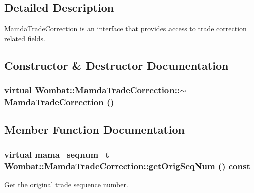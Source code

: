 \subsection{Detailed Description}
\hyperlink{classWombat_1_1MamdaTradeCorrection}{Mamda\-Trade\-Correction} is an interface that provides access to trade correction related fields. 



\subsection{Constructor \& Destructor Documentation}
\hypertarget{classWombat_1_1MamdaTradeCorrection_b4d18a65d80de13f1a889dce7055a47a}{
\subsubsection[$\sim$MamdaTradeCorrection]{\setlength{\rightskip}{0pt plus 5cm}virtual Wombat::Mamda\-Trade\-Correction::$\sim$Mamda\-Trade\-Correction ()}}
\label{classWombat_1_1MamdaTradeCorrection_b4d18a65d80de13f1a889dce7055a47a}




\subsection{Member Function Documentation}
\hypertarget{classWombat_1_1MamdaTradeCorrection_fcec3aec725d1d8fdcb304769f42ddab}{
\subsubsection[getOrigSeqNum]{\setlength{\rightskip}{0pt plus 5cm}virtual mama\_\-seqnum\_\-t Wombat::Mamda\-Trade\-Correction::get\-Orig\-Seq\-Num () const}}
\label{classWombat_1_1MamdaTradeCorrection_fcec3aec725d1d8fdcb304769f42ddab}


Get the original trade sequence number. 

